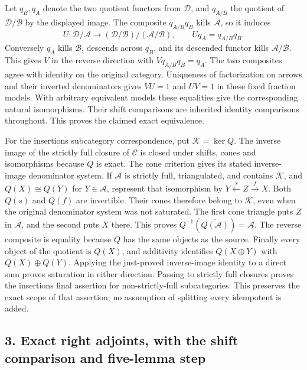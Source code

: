 Let \(q_B,q_A\) denote the two quotient functors from \(\mathcal D\),\allowbreak{} and \(q_{A/B}\) the quotient of \(\mathcal D/\mathcal B\) by the displayed image. The composite \(q_{A/B}q_B\) kills \(\mathcal A\),\allowbreak{} so it induces \[
U:\mathcal D/\mathcal A\longrightarrow
(\mathcal D/\mathcal B)/(\mathcal A/\mathcal B),\qquad
Uq_A=q_{A/B}q_B.
\] Conversely \(q_A\) kills \(\mathcal B\),\allowbreak{} descends across \(q_B\),\allowbreak{} and its descended functor kills \(\mathcal A/\mathcal B\). This gives \(V\) in the reverse direction with \(Vq_{A/B}q_B=q_A\). The two composites agree with identity on the original category. Uniqueness of factorization on arrows and their inverted denominators gives \(VU=1\) and \(UV=1\) in these fixed fraction models. With arbitrary equivalent models these equalities give the corresponding natural isomorphisms. Their shift comparisons are inherited identity comparisons throughout. This proves the claimed exact equivalence.

For the insertion\textquotesingle s subcategory correspondence,\allowbreak{} put \(\mathcal K=\ker Q\). The inverse image of the strictly full closure of \(\mathcal C\) is closed under shifts,\allowbreak{} cones and isomorphisms because \(Q\) is exact. The cone criterion gives its stated inverse-image denominator system. If \(\mathcal A\) is strictly full,\allowbreak{} triangulated,\allowbreak{} and contains \(\mathcal K\),\allowbreak{} and \(Q(X)\cong Q(Y)\) for \(Y\in\mathcal A\),\allowbreak{} represent that isomorphism by \(Y\xleftarrow sZ\xrightarrow fX\). Both \(Q(s)\) and \(Q(f)\) are invertible. Their cones therefore belong to \(\mathcal K\),\allowbreak{} even when the original denominator system was not saturated. The first cone triangle puts \(Z\) in \(\mathcal A\),\allowbreak{} and the second puts \(X\) there. This proves \(Q^{-1}(\overline{Q(\mathcal A)})=\mathcal A\). The reverse composite is equality because \(Q\) has the same objects as the source. Finally every object of the quotient is \(Q(X)\),\allowbreak{} and additivity identifies \(Q(X\oplus Y)\) with \(Q(X)\oplus Q(Y)\). Applying the just-proved inverse-image identity to a direct sum proves saturation in either direction. Passing to strictly full closures proves the insertion\textquotesingle s final assertion for non-strictly-full subcategories. This preserves the exact scope of that assertion; no assumption of splitting every idempotent is added.

\subsection{\texorpdfstring{3. Exact right adjoints,\allowbreak{} with the shift comparison and five-lemma step}{3. Exact right  with the shift comparison and five-lemma step}}\label{proofs-1844-2401-exact-right-adjoints-with-the-shift-comparison-and-five-lemma-step}

